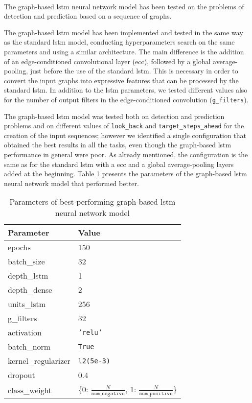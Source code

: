 \paragraph{} The graph-based \acs{lstm} neural network model has been tested on the problems of detection and prediction based on a sequence of graphs.

The graph-based \acs{lstm} model has been implemented and tested in the same way as the standard \acs{lstm} model, conducting hyperparameters search on the same parameters and using a similar architecture. The main difference is the addition of an edge-conditioned convolutional layer (\acs{ecc}), followed by a global average-pooling, just before the use of the standard \acs{lstm}. This is necessary in order to convert the input graphs into expressive features that can be processed by the standard \acs{lstm}. In addition to the \acs{lstm} parameters, we tested different values also for the number of output filters in the edge-conditioned convolution (\texttt{g\_filters}).

The graph-based \acs{lstm} model was tested both on detection and prediction problems and on different values of \texttt{look\_back} and \texttt{target\_steps\_ahead} for the creation of the input sequences; however we identified a single configuration that obtained the best results in all the tasks, even though the graph-based \acs{lstm} performance in general were poor. As already mentioned, the configuration is the same as for the standard \acs{lstm} with a \acs{ecc} and a global average-pooling layers added at the beginning. Table \ref{tab:glstm_param} presents the parameters of the graph-based \acs{lstm} neural network model that performed better.
\begin{table}[htbp]
    \centering
    \begin{tabular}{ll}
        \hline
        \textbf{Parameter}  & \textbf{Value} \\\hline
        epochs              & 150 \\
        batch\_size         & 32 \\
        depth\_lstm         & 1 \\
        depth\_dense        & 2 \\
        units\_lstm         & 256 \\
        g\_filters          & 32 \\
        activation          & \texttt{'relu'} \\
        batch\_norm         & \texttt{True} \\
        kernel\_regularizer & \texttt{l2(5e-3)} \\
        dropout             & 0.4 \\
        class\_weight       & \{0: $\frac{N}{\texttt{num\_negative}}$, 1: $\frac{N}{\texttt{num\_positive}}$\}
    \end{tabular}
    \caption{Parameters of best-performing graph-based \acs{lstm} neural network model}
    \label{tab:glstm_param}
\end{table}


